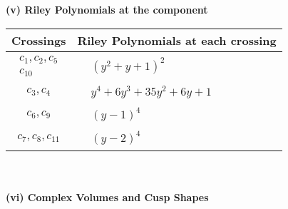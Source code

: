 \documentclass[1p]{elsarticle_modified}
\theoremstyle{definition}
\begin{document}
\newpage\renewcommand{\arraystretch}{1}
\flushleft \textbf{(v) Riley Polynomials at the component}\newline \\
\begin{tabular}{m{50pt}|m{274pt}}
Crossings & \hspace{64pt}Riley Polynomials at each crossing \\
\hline $$\begin{aligned}c_{1},c_{2},c_{5}\\c_{10}\end{aligned}$$&$\begin{aligned}
&(y^2+y+1)^2
\end{aligned}$\\
\hline $$\begin{aligned}c_{3},c_{4}\end{aligned}$$&$\begin{aligned}
&y^4+6 y^3+35 y^2+6 y+1
\end{aligned}$\\
\hline $$\begin{aligned}c_{6},c_{9}\end{aligned}$$&$\begin{aligned}
&(y-1)^4
\end{aligned}$\\
\hline $$\begin{aligned}c_{7},c_{8},c_{11}\end{aligned}$$&$\begin{aligned}
&(y-2)^4
\end{aligned}$\\
\hline
\end{tabular}\\~\\
\newpage\flushleft \textbf{(vi) Complex Volumes and Cusp Shapes}
\end{document}
